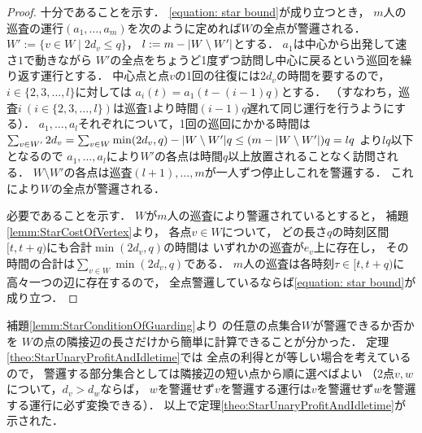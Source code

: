 \begin{proof}
  十分であることを示す．
  \eqref{equation: star bound}が成り立つとき，
  $m$人の巡査の運行$(a_1, \ldots, a_m)$を次のように定めれば$W$の全点が警邏される．
  $W' := \{ v \in W \mid 2d_v \leq q \}$，
  $l := m - \lvert{W \setminus W'}\rvert$とする．
  $a_1$は中心から出発して速さ$1$で動きながら
  $W'$の全点をちょうど1度ずつ訪問し中心に戻るという巡回を繰り返す運行とする．
  中心点と点$v$の1回の往復には$2d_v$の時間を要するので，
  $i \in \{ 2, 3, \ldots, l \}$に対しては
  $a_i(t) = a_1(t - (i - 1)q)$とする．
  （すなわち，巡査$i\ (i \in \{ 2, 3, \ldots, l \})$は巡査$1$より時間$(i - 1)q$遅れて同じ運行を行うようにする）．
  $a_1, \ldots, a_l$それぞれについて，1回の巡回にかかる時間は
  $\sum_{v \in W'} 2d_v
    = \sum_{v \in W} \min(2d_v, q) - \lvert{W \setminus W'}\rvert q
    \leq (m - \lvert{W \setminus W'}\rvert)q = lq$%
  より$lq$以下となるので
  $a_1, \ldots, a_l$により$W'$の各点は時間$q$以上放置されることなく訪問される．
  $W \setminus W'$の各点は巡査$(l + 1), \ldots, m$が一人ずつ停止しこれを警邏する．
  これにより$W$の全点が警邏される．

  必要であることを示す．
  $W$が$m$人の巡査により警邏されているとすると，
  補題\ref{lemm:StarCostOfVertex}より，
  各点$v \in W$について，
  どの長さ$q$の時刻区間$[t, t + q)$にも合計$\min(2d_v, q)$の時間は
  いずれかの巡査が$e_v$上に存在し，
  その時間の合計は$\sum_{v \in W} \min(2d_v, q)$である．
  $m$人の巡査は各時刻$\tau \in [t, t + q)$に高々一つの辺に存在するので，
  全点警邏しているならば\eqref{equation: star bound}が成り立つ．
\end{proof}


補題\ref{lemm:StarConditionOfGuarding}より
{\graphStar}の任意の点集合$W$が警邏できるか否かを
$W$の点の隣接辺の長さだけから簡単に計算できることが分かった．
定理\ref{theo:StarUnaryProfitAndIdletime}では
全点の利得と{\maxIdletime}が等しい場合を考えているので，
警邏する部分集合としては隣接辺の短い点から順に選べばよい
（2点$v, w$について，$d_v > d_w$ならば，
$w$を警邏せず$v$を警邏する運行は$v$を警邏せず$w$を警邏する運行に必ず変換できる）．
以上で定理\ref{theo:StarUnaryProfitAndIdletime}が示された．
